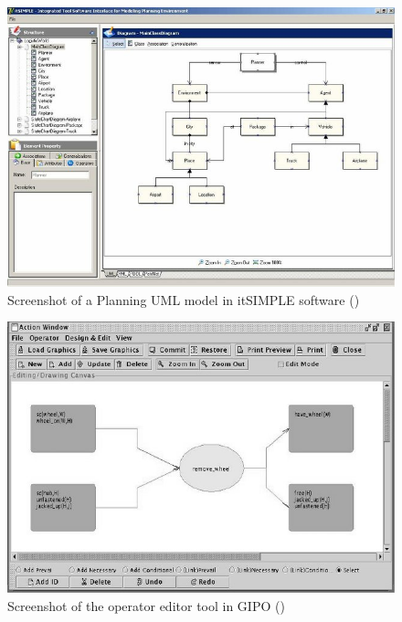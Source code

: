 \begin{figure}[h]
	\centering
	\includegraphics[width=0.93\linewidth]{figures/itsimple}
	\caption{Screenshot of a Planning UML model in itSIMPLE software (\cite{vaquero2013itsimple})}
	\label{fig:itSimple}
\end{figure}
\begin{figure}[h]
	\centering
	\includegraphics[width=0.93\linewidth]{figures/gipoaction}
	\caption{Screenshot of the operator editor tool in GIPO (\cite{mccluskey2005using})}
	\label{fig:gipoaction}
\end{figure}


